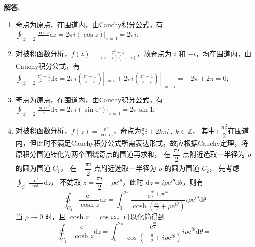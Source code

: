 \documentclass[11pt]{ctexart}
\newenvironment{solution}{\par\noindent\textbf{解答. }}{\par}
\begin{document}
\begin{solution}
    \begin{enumerate}[(1)]
        \item 奇点为原点，在围道内，由Cauchy积分公式，有\\
              $\displaystyle\oint_{\left|z\right|=2} \frac{\cos{z}}{z}\text{d}z = 
              2\pi i(\cos{z})|_{z=0} = 
              2\pi i$;
        \item 对被积函数分析，$\displaystyle f(z)=\frac{z^2-1}{(z+i)(z-i)}$，故奇点为 $i$ 和 $-i$，均在围道内，由Cauchy积分公式，有\\
              $\displaystyle\oint_{\left|z\right|=2} \frac{z^2-1}{z^2+1}\text{d}z = 
              2\pi i(\frac{z^2-1}{z+i})|_{z=i} + 2\pi i(\frac{z^2-1}{z-i})|_{z=-i} = 
              -2\pi + 2\pi = 
              0$;
        \item 奇点为原点，在围道内，由Cauchy积分公式，有\\
              $\displaystyle\oint_{\left|z\right|=2} \frac{\sin{\text{e}^z}}{z}\text{d}z = 
              2\pi i(\sin{\text{e}^z})|_{z=0} = 
              2\pi \sin{1} $;
        \item 对被积函数分析，$\displaystyle f(z)=\frac{\text{e}^{z}}{\cos{iz}}$，奇点为$\displaystyle\frac{\pi}{2}i+2k\pi i\ ,\ k\in\mathbb{Z}$，
              其中$\pm\dfrac{\pi i}{2}$在围道内，但此时不满足Cauchy积分公式所需表达形式，故应根据Cauchy定理，将原积分围道转化为两个围绕奇点的围道再求和，
              在 $\dfrac{\pi i}{2}$ 点附近选取一半径为 $\rho$ 的圆为围道 $C_1$，
              在 $-\dfrac{\pi i}{2}$ 点附近选取一半径为 $\rho$ 的圆为围道 $C_2$，
              先考虑$\displaystyle\oint_{C_1} \frac{\text{e}^z}{\cosh{z}}\text{d}z$，
              不妨取 $z=\dfrac{\pi i}{2}+\rho\text{e}^{i\theta}$，此时 $\text{d}z=i\rho\text{e}^{i\theta}\text{d}\theta$，则有
              \begin{equation*}
                \oint_{C_1} \frac{\text{e}^z}{\cosh{z}}\text{d}z = 
                \int_{0}^{2\pi}\frac{\text{e}^{\frac{\pi i}{2}+\rho\text{e}^{i\theta}}}{\cosh{(\frac{\pi i}{2}+\rho\text{e}^{i\theta})}}i\rho\text{e}^{i\theta}\text{d}\theta
              \end{equation*}
              当 $\rho\to0$ 时，且 $\cosh{z}=\cos{iz}$，可以化简得到
              \begin{equation*}
                \oint_{C_1} \frac{\text{e}^z}{\cosh{z}}\text{d}z = 
                \int_{0}^{2\pi}\frac{\text{e}^{\frac{\pi i}{2}}}{\cos{(-\frac{\pi}{2}+i\rho\text{e}^{i\theta})}}i\rho\text{e}^{i\theta}\text{d}\theta = 

\end{equation*}
\end{enumerate}
\end{solution}
\end{document}
